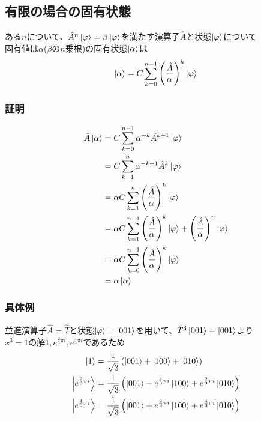 \documentclass{ltjsarticle}
\begin{document}
\subsection{有限の場合の固有状態}
ある$n$について、$\hat{A}^n\ket{\varphi}=\beta\ket{\varphi}$を満たす演算子$\hat{A}$と状態$\ket{\varphi}$について\\
固有値は$\alpha$($\beta$の$n$乗根)の固有状態$\ket{\alpha}$は
\begin{align}
  \ket{\alpha} &= C\sum_{k=0}^{n-1} \left(\frac{\hat{A}}{\alpha} \right)^k \ket{\varphi}\\
\end{align}
\subsubsection*{証明}
\begin{align}
  \hat{A}\ket{\alpha} &= C\sum_{k=0}^{n-1} \alpha^{-k} \hat{A}^{k+1} \ket{\varphi}\\
  &= C\sum_{k=1}^{n} \alpha^{-k+1} \hat{A}^{k} \ket{\varphi}\\
  &= \alpha C\sum_{k=1}^{n} \left(\frac{\hat{A}}{\alpha} \right)^{k} \ket{\varphi}\\
  &= \alpha C\sum_{k=1}^{n-1} \left(\frac{\hat{A}}{\alpha} \right)^{k} \ket{\varphi}+\left(\frac{\hat{A}}{\alpha} \right)^{n} \ket{\varphi}\\
  &= \alpha C\sum_{k=0}^{n-1} \left(\frac{\hat{A}}{\alpha} \right)^{k} \ket{\varphi}\\
  &= \alpha \ket{\alpha}
\end{align}
\subsubsection*{具体例}
並進演算子$\hat{A}=\hat{T}$と状態$\ket{\varphi}=\ket{001}$を用いて、$\hat{T}^3\ket{001}=\ket{001}$より\\
$x^3=1$の解$1,e^{\frac{2}{3}\pi i},e^{\frac{4}{3}\pi i}$であるため
\begin{align}
  \ket{1} &= \frac{1}{\sqrt{3}}\left(\ket{001}+\ket{100}+\ket{010}\right)\\
  \ket{e^{\frac{2}{3}\pi i}} &= \frac{1}{\sqrt{3}}\left(\ket{001}+e^{\frac{4}{3}\pi i}\ket{100}+e^{\frac{2}{3}\pi i}\ket{010}\right)\\
  \ket{e^{\frac{4}{3}\pi i}} &= \frac{1}{\sqrt{3}}\left(\ket{001}+e^{\frac{2}{3}\pi i}\ket{100}+e^{\frac{4}{3}\pi i}\ket{010}\right)
\end{align}
\end{document}
